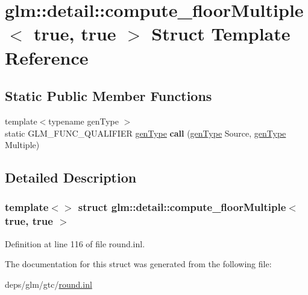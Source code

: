 \hypertarget{structglm_1_1detail_1_1compute__floorMultiple_3_01true_00_01true_01_4}{}\section{glm\+:\+:detail\+:\+:compute\+\_\+floor\+Multiple$<$ true, true $>$ Struct Template Reference}
\label{structglm_1_1detail_1_1compute__floorMultiple_3_01true_00_01true_01_4}
\subsection*{Static Public Member Functions}
\begin{DoxyCompactItemize}
\item 
\mbox{\label{structglm_1_1detail_1_1compute__floorMultiple_3_01true_00_01true_01_4_a18fef0ea82a4549501b832f4571ab1c5}} 
{\footnotesize template$<$typename gen\+Type $>$ }\\static G\+L\+M\+\_\+\+F\+U\+N\+C\+\_\+\+Q\+U\+A\+L\+I\+F\+I\+ER \hyperlink{structglm_1_1detail_1_1genType}{gen\+Type} {\bfseries call} (\hyperlink{structglm_1_1detail_1_1genType}{gen\+Type} Source, \hyperlink{structglm_1_1detail_1_1genType}{gen\+Type} Multiple)
\end{DoxyCompactItemize}


\subsection{Detailed Description}
\subsubsection*{template$<$$>$\newline
struct glm\+::detail\+::compute\+\_\+floor\+Multiple$<$ true, true $>$}



Definition at line 116 of file round.\+inl.



The documentation for this struct was generated from the following file\+:\begin{DoxyCompactItemize}
\item 
deps/glm/gtc/\hyperlink{round_8inl}{round.\+inl}\end{DoxyCompactItemize}
